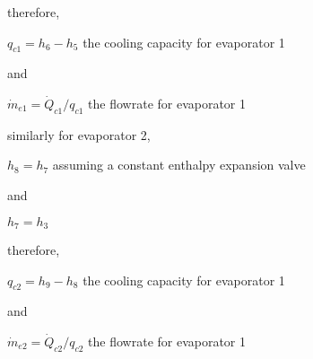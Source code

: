 \documentclass[letterpaper,10pt,english]{jupyterBook}
\begin{document}
\sphinxAtStartPar
therefore,

\sphinxAtStartPar
\(q_{c1}=h_6-h_5\) the cooling capacity for evaporator 1

\sphinxAtStartPar
and

\sphinxAtStartPar
\(\dot m_{e1}=\dot Q_{c1}/q_{c1}\) the flow\sphinxhyphen{}rate for evaporator 1

\sphinxAtStartPar
similarly for evaporator 2,

\sphinxAtStartPar
\(h_8=h_7\) assuming a constant enthalpy expansion valve

\sphinxAtStartPar
and

\sphinxAtStartPar
\(h_7=h_3\)

\sphinxAtStartPar
therefore,

\sphinxAtStartPar
\(q_{c2}=h_9-h_8\) the cooling capacity for evaporator 1

\sphinxAtStartPar
and

\sphinxAtStartPar
\(\dot m_{e2}=\dot Q_{c2}/q_{c2}\) the flow\sphinxhyphen{}rate for evaporator 1
\end{document}

